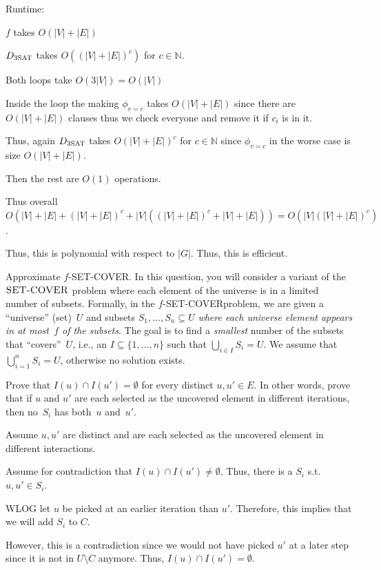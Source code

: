 \documentclass[12pt, letterpaper]{article}
\newcommand{\N}{\mathbb{N}}
\begin{document}
\begin{problemproof}
    Runtime:

    $f$ takes $O(|V|+|E|)$

    $D_{\textsc{3SAT}}$ takes $O((|V|+|E|)^c)$ for $c \in \N$.

    Both loops take $O(3|V|)=O(|V|)$

    Inside the loop the making $\phi_{v=c}$ takes $O(|V|+|E|)$ since there are $O(|V|+|E|)$ clauses thus we check everyone and remove it if $c_i$ is in it.

    Thus, again $D_{\textsc{3SAT}}$ takes $O(|V|+|E|)^c$ for $c \in \N$ since $\phi_{v=c}$ in the worse case is size $O(|V|+|E|)$.

    Then the rest are $O(1)$ operations.

    Thus overall $O(|V|+|E|+(|V|+|E|)^c+|V|((|V|+|E|)^c+|V|+|E|))=O(|V|(|V|+|E|)^c)$.

    Thus, this is polynomial with respect to $|G|$. Thus, this is efficient.
\end{problemproof}
\newcommand{\SC}{\textsc{SET-COVER}}
\begin{problem}{Approximate $f$-\SC.}
    In this question, you will consider a variant of the $\SC$ problem where each element of the universe is in a limited number of subsets.
  Formally, in the $f$-\SC problem, we are given a ``universe'' (set)~$U$ and subsets $S_1, \ldots, S_n \subseteq U$ \emph{where each universe element appears in at most~$f$ of the subsets}.
  The goal is to find a \emph{smallest} number of the subsets that ``covers''~$U$, i.e., an $I \subseteq \{1,\ldots,n\}$ such that $\bigcup_{i \in I} S_{i} = U$.
  We assume that $\bigcup_{i=1}^{n} S_{i} = U$, otherwise no solution exists.
\end{problem}

\begin{subproblem}{}
    Prove that $I(u) \cap I(u') = \emptyset$ for every distinct $u, u' \in E$.
    In other words, prove that if $u$ and $u'$ are each selected as the uncovered element in different iterations, then no~$S_i$ has both~$u$ and~$u'$.
\end{subproblem}
\begin{problemproof}
    Assume $u,u'$ are distinct and are each selected as the uncovered element in different interactions.

    Assume for contradiction that $I(u) \cap I(u') \neq \emptyset$. Thus, there is a $S_i$ s.t. $u,u' \in S_i$.

    WLOG let $u$ be picked at an earlier iteration than $u'$. Therefore, this implies that we will add $S_i$ to $C$.

    However, this is a contradiction since we would not have picked $u'$ at a later step since it is not in $U \setminus C$ anymore. Thus, $I(u) \cap I(u') = \emptyset$.
\end{problemproof}
\end{document}
